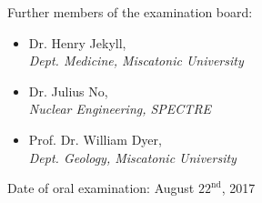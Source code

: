 \hspace{-1cm}Further members of the examination board:
\begin{itemize}
 \item Dr. Henry Jekyll, \\
 \textit{Dept. Medicine, Miscatonic University}
 \item Dr. Julius No, \\
 \textit{Nuclear Engineering, SPECTRE}
 \item Prof. Dr. William Dyer, \\
 \textit{Dept. Geology, Miscatonic University}
\end{itemize}
\vspace{1cm}
\hspace{-.5cm}Date of oral examination: August $22^\text{nd}$, 2017
%
%
%
%
%
%
%
%
%
%
%
%
%
%
%
%
% 
\null
\newpage
\thispagestyle{empty}
%
%
%
%
%
%
%
%
\clearpage
{} %
